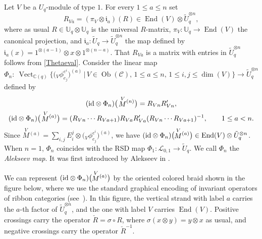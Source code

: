 \documentclass[pdftex]{sigma}%
\numberwithin{equation}{section}
\numberwithin{figure}{section}
\newcommand{\mUq}{\mathbb{U}_q}
\newcommand{\mc}{\mathbb{C}}
\newcommand{\Ll}{{\mathcal L}}
\newcommand{\ra}{\rightarrow}
\begin{document}
Let $V$ be a $U_q$-module of type $1$. For every $1\leq a\leq n$ set
\[
R_{Va} = (\pi_V\otimes \mathfrak{i}_a)(R) \in \operatorname{End}(V)\otimes \tilde U_q^{{\otimes} n},
\]
where as usual $R\in \mUq{\otimes} \mUq$ is the universal $R$-matrix, $\pi_V\colon \mUq \ra \operatorname{End}(V)$ the canonical projection, and $\mathfrak{i}_a \colon \tilde U_q \ra \tilde U_q^{\otimes n}$ the map defined by $\mathfrak{i}_a(x) = 1^{\otimes (a-1)}\otimes x\otimes 1^{\otimes (n-a)}$. That $R_{Va}$ is a matrix with entries in $\tilde U_q^{{\otimes} n}$ follows from \eqref{Thetaeval}. Consider the linear map
\[
\Phi_n \colon\ \operatorname{Vect}_{\mc(q)}\big\{\big({}_V\phi^{e^i}_{e_j}\big)^{(a)}\, \big\vert \, V\in \operatorname{Ob}(\mathcal{C}),\, 1\leq a\leq n,\, 1\leq i,j \leq \dim (V) \big\}\longrightarrow \tilde U_q^{{\otimes} n}
\]
defined by
\begin{gather}
({\rm id} \otimes \Phi_n)\big(\!\stackrel{V}{M}{}^{\!\! (n)}\big) = R_{Vn}R_{Vn}', \nonumber
\\ %
({\rm id} \otimes \Phi_n)\big(\!\stackrel{V}{M}{}^{\!\! (a)}\big) = (R_{Vn}\cdots R_{Va+1}) R_{Va}R_{Va}' (R_{Vn}\cdots R_{Va+1})^{-1}, \qquad
1\leq a < n. \label{definitionofphin2}
\end{gather}
Since $\textstyle \stackrel{V}{M}{}^{\!\! (a)}=\sum_{i,j }E_i^j\otimes \big({}_V\phi^{e^i}_{e_j}\big)^{(a)}$, we have $({\rm id} \otimes \Phi_n)\big(\!\!\stackrel{V}{M}{}^{\!\! (a)}\big) \in \operatorname{End}(V)\otimes \tilde U_q^{{\otimes} n}$. When $n=1$, $\Phi_n$ coincides with the RSD map $\Phi_1\colon \Ll_{0,1} \ra \tilde U_q$. We call $\Phi_n$ the {\it Alekseev map}. It was first introduced by Alekseev in \cite{A}.

We can represent $({\rm id} \otimes \Phi_n)\big(\!\!\stackrel{V}{M}{}^{\!\! (a)}\big)$ by the oriented colored braid shown in the figure below, where we use the standard graphical encoding of invariant operators of ribbon categories (see~\cite{Tu}). In this figure, the vertical strand with label $a$ carries the $a$-th factor of $\tilde U_q^{{\otimes} n}$, and the one with label $V$ carries $\operatorname{End}(V)$. Positive crossings carry the operator $\check{R} = \sigma \circ R$, where $\sigma(x\otimes y) = y\otimes x$ as usual, and negative crossings carry the operator $\check{R}^{-1}$.
\end{document}
